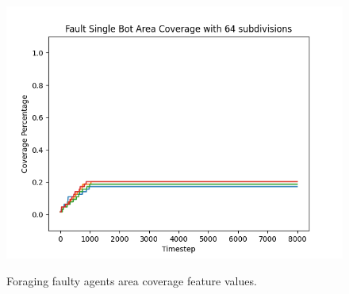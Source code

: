 \documentclass[../../Thesis.tex]{subfiles}
\begin{document}
\begin{figure}[H]
{						\includegraphics[scale=0.22]{../../Images/Experiments/foraging_size6x8_bot_number38_fault_10_percent_rotating_fault_after_1000/Fault_Single_Bot_Area_Coverage_with_64_subdivisions.png}
					}
					\caption{Foraging faulty agents area coverage feature values.}
					\label{fig:foraging_faulty agents_area_coverage}
				\end{figure}
					
\end{document}
